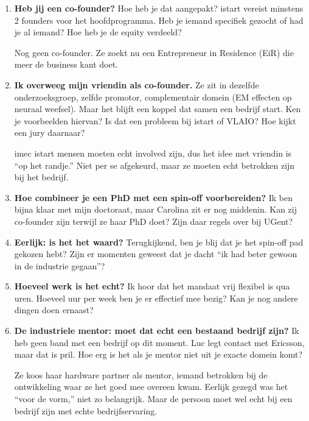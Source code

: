\documentclass[11pt,a4paper]{article}
\newcommand{\notebox}{%
\begin{tcolorbox}[colback=notebg, colframe=noteborder, boxrule=0.5pt, arc=2pt, left=4pt, right=4pt, top=2pt, bottom=2pt]
\vspace{2.2cm}
\end{tcolorbox}
}
\newcommand{\filledbox}[1]{%
\begin{tcolorbox}[colback=notebg, colframe=noteborder, boxrule=0.5pt, arc=2pt, left=4pt, right=4pt, top=2pt, bottom=2pt]
#1
\end{tcolorbox}
}
\begin{document}
\begin{enumerate}

\item \textbf{Heb jij een co-founder?} Hoe heb je dat aangepakt? istart vereist minstens 2 founders voor het hoofdprogramma. Heb je iemand specifiek gezocht of had je al iemand? Hoe heb je de equity verdeeld?

\filledbox{Nog geen co-founder. Ze zoekt nu een Entrepreneur in Residence (EiR) die meer de business kant doet.}

\item \textbf{Ik overweeg mijn vriendin als co-founder.} Ze zit in dezelfde onderzoeksgroep, zelfde promotor, complementair domein (EM effecten op neuraal weefsel). Maar het blijft een koppel dat samen een bedrijf start. Ken je voorbeelden hiervan? Is dat een probleem bij istart of VLAIO? Hoe kijkt een jury daarnaar?

\filledbox{imec istart mensen moeten echt involved zijn, dus het idee met vriendin is ``op het randje.'' Niet per se afgekeurd, maar ze moeten echt betrokken zijn bij het bedrijf.}

\item \textbf{Hoe combineer je een PhD met een spin-off voorbereiden?} Ik ben bijna klaar met mijn doctoraat, maar Carolina zit er nog middenin. Kan zij co-founder zijn terwijl ze haar PhD doet? Zijn daar regels over bij UGent?

\notebox

\item \textbf{Eerlijk: is het het waard?} Terugkijkend, ben je blij dat je het spin-off pad gekozen hebt? Zijn er momenten geweest dat je dacht ``ik had beter gewoon in de industrie gegaan''?

\notebox

\item \textbf{Hoeveel werk is het echt?} Ik hoor dat het mandaat vrij flexibel is qua uren. Hoeveel uur per week ben je er effectief mee bezig? Kan je nog andere dingen doen ernaast?

\notebox

\item \textbf{De industriele mentor: moet dat echt een bestaand bedrijf zijn?} Ik heb geen band met een bedrijf op dit moment. Luc legt contact met Ericsson, maar dat is pril. Hoe erg is het als je mentor niet uit je exacte domein komt?

\filledbox{Ze koos haar hardware partner als mentor, iemand betrokken bij de ontwikkeling waar ze het goed mee overeen kwam. Eerlijk gezegd was het ``voor de vorm,'' niet zo belangrijk. Maar de persoon moet wel echt bij een bedrijf zijn met echte bedrijfservaring.}

\end{enumerate}
\end{document}
